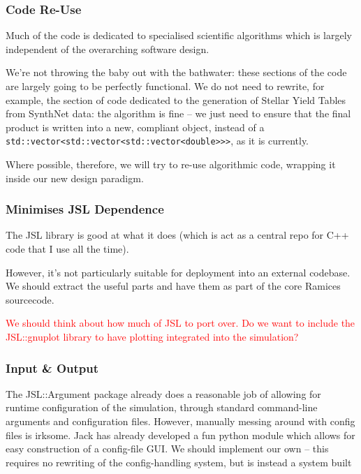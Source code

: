 \documentclass[a4paper,10pt]{article}
\begin{document}
				\subsubsection{Code Re-Use}

					Much of the code is dedicated to specialised scientific algorithms which is largely independent of the overarching software design.

					We're not throwing the baby out with the bathwater: these sections of the code are largely going to be perfectly functional. We do not need to rewrite, for example, the section of code dedicated to the generation of Stellar Yield Tables from SynthNet data: the algorithm is fine -- we just need to ensure that the final product is written into a new, compliant object, instead of a \texttt{std::vector<std::vector<std::vector<double>>>}, as it is currently.
					
					Where possible, therefore, we will try to re-use algorithmic code, wrapping it inside our new design paradigm.
				
				\subsubsection{Minimises JSL Dependence}
					
					The JSL library is good at what it does (which is act as a central repo for C++ code that I use all the time). 

					However, it's not particularly suitable for deployment into an external codebase. We should extract the useful parts and have them as part of the core Ramices sourcecode.

					\textcolor{red}{We should think about how much of JSL to port over. Do we want to include the JSL::gnuplot library to have plotting integrated into the simulation?} 
				\subsubsection{Input \& Output}
					The JSL::Argument package already does a reasonable job of allowing for runtime configuration of the simulation, through standard command-line arguments and configuration files. However, manually messing around with config files is irksome. Jack has already developed a fun python module which allows for easy construction of a config-file GUI. We should implement our own -- this requires no rewriting of the config-handling system, but is instead a system built 


	\newpage
\end{document}
